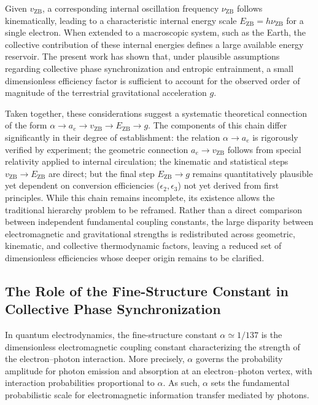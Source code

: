 \documentclass[12pt,letterpaper]{article}
\begin{document}
Given $v_{\mathrm{ZB}}$, a corresponding internal oscillation frequency $\nu_{\mathrm{ZB}}$ follows kinematically, leading to a characteristic internal energy scale $E_{\mathrm{ZB}} = h \nu_{\mathrm{ZB}}$ for a single electron. When extended to a macroscopic system, such as the Earth, the collective contribution of these internal energies defines a large available energy reservoir. The present work has shown that, under plausible assumptions regarding collective phase synchronization and entropic entrainment, a small dimensionless efficiency factor is sufficient to account for the observed order of magnitude of the terrestrial gravitational acceleration $g$.

Taken together, these considerations suggest a systematic theoretical connection of the form $\alpha \rightarrow a_e \rightarrow v_{\mathrm{ZB}} \rightarrow E_{\mathrm{ZB}} \rightarrow g$. The components of this chain differ significantly in their degree of establishment: the relation $\alpha \to a_e$ is rigorously verified by experiment; the geometric connection $a_e \to v_{\mathrm{ZB}}$ follows from special relativity applied to internal circulation; the kinematic and statistical steps $v_{\mathrm{ZB}} \to E_{\mathrm{ZB}}$ are direct; but the final step $E_{\mathrm{ZB}} \to g$ remains quantitatively plausible yet dependent on conversion efficiencies ($\epsilon_2, \epsilon_3$) not yet derived from first principles. While this chain remains incomplete, its existence allows the traditional hierarchy problem to be reframed. Rather than a direct comparison between independent fundamental coupling constants, the large disparity between electromagnetic and gravitational strengths is redistributed across geometric, kinematic, and collective thermodynamic factors, leaving a reduced set of dimensionless efficiencies whose deeper origin remains to be clarified.


\subsection{The Role of the Fine-Structure Constant in Collective Phase Synchronization}

In quantum electrodynamics, the fine-structure constant $\alpha \simeq 1/137$ is the dimensionless electromagnetic coupling constant characterizing the strength of the electron--photon interaction. More precisely, $\alpha$ governs the probability amplitude for photon emission and absorption at an electron--photon vertex, with interaction probabilities proportional to $\alpha$. As such, $\alpha$ sets the fundamental probabilistic scale for electromagnetic information transfer mediated by photons.
\end{document}
